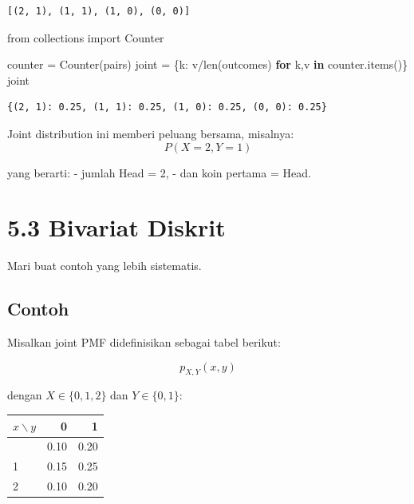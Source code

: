 \documentclass[
  letterpaper,
  DIV=11,
  numbers=noendperiod]{scrreprt}
\newenvironment{Shaded}{\begin{snugshade}}{\end{snugshade}}
\newcommand{\BuiltInTok}[1]{\textcolor[rgb]{0.00,0.23,0.31}{#1}}
\newcommand{\ControlFlowTok}[1]{\textcolor[rgb]{0.00,0.23,0.31}{\textbf{#1}}}
\newcommand{\ImportTok}[1]{\textcolor[rgb]{0.00,0.46,0.62}{#1}}
\newcommand{\KeywordTok}[1]{\textcolor[rgb]{0.00,0.23,0.31}{\textbf{#1}}}
\newcommand{\NormalTok}[1]{\textcolor[rgb]{0.00,0.23,0.31}{#1}}
\newcommand{\OperatorTok}[1]{\textcolor[rgb]{0.37,0.37,0.37}{#1}}
\newcounter{none} %
\begin{document}
\begin{verbatim}
[(2, 1), (1, 1), (1, 0), (0, 0)]
\end{verbatim}

\begin{Shaded}
\begin{Highlighting}[]
\ImportTok{from}\NormalTok{ collections }\ImportTok{import}\NormalTok{ Counter}

\NormalTok{counter }\OperatorTok{=}\NormalTok{ Counter(pairs)}
\NormalTok{joint }\OperatorTok{=}\NormalTok{ \{k: v}\OperatorTok{/}\BuiltInTok{len}\NormalTok{(outcomes) }\ControlFlowTok{for}\NormalTok{ k,v }\KeywordTok{in}\NormalTok{ counter.items()\}}
\NormalTok{joint}
\end{Highlighting}
\end{Shaded}

\begin{verbatim}
{(2, 1): 0.25, (1, 1): 0.25, (1, 0): 0.25, (0, 0): 0.25}
\end{verbatim}

Joint distribution ini memberi peluang bersama, misalnya: \[
P(X=2, Y=1)
\]

yang berarti: - jumlah Head = 2, - dan koin pertama = Head.

\section{5.3 Bivariat Diskrit}\label{bivariat-diskrit}

Mari buat contoh yang lebih sistematis.

\subsection{Contoh}\label{contoh}

Misalkan joint PMF didefinisikan sebagai tabel berikut:

\[
p_{X,Y}(x,y)
\]

dengan \(X \in \{0,1,2\}\) dan \(Y \in \{0,1\}\):

{\def\LTcaptype{none} %
\begin{longtable}[]{@{}lrr@{}}
\toprule\noalign{}
\(x \backslash y\) & 0 & 1 \\
\midrule\noalign{}
\endhead
\bottomrule\noalign{}
\endlastfoot
0 & 0.10 & 0.20 \\
1 & 0.15 & 0.25 \\
2 & 0.10 & 0.20 \\
\end{longtable}
}
\end{document}
